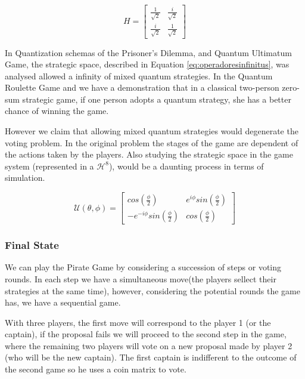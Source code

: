 \begin{equation}
H = \left[\begin{array}{cc}
\frac{1}{\sqrt{2}} & \frac{i}{\sqrt{2}}\\
\frac{i}{\sqrt{2}} & \frac{1}{\sqrt{2}}
\end{array}\right]
\label{eq:operators_piratas_quanticos_esoterico}
\end{equation}

In Quantization schemas of the Prisoner's Dilemma\cite{Letters2002}\cite{Eisert2008}, and Quantum Ultimatum Game\cite{Fra2011}, the strategic space, described in Equation \ref{eq:operadoresinfinitus}, was analysed allowed a infinity of mixed quantum strategies. In the Quantum Roulette Game\cite{Salimi2009} and \cite{Meyer1999} we have a demonstration that in a classical two-person zero-sum strategic game, if one person adopts a quantum strategy, she has a better chance of winning the game. 

However we claim that allowing mixed quantum strategies would degenerate the voting problem. In the original problem the stages of the game are dependent of the actions taken by the players. Also studying the strategic space in the game system (represented in a $\mathcal{H}^{8}$), would be a daunting process in terms of simulation. 

\begin{equation}
\mathcal{U}(\theta,\phi) = \left[\begin{array}{cc}
cos(\frac{\phi}{2}) & e^{i\phi}sin(\frac{\phi}{2})\\
-e^{-i\phi}sin(\frac{\phi}{2}) & cos(\frac{\phi}{2})
\end{array}\right]
\label{eq:operadoresinfinitus}
\end{equation}

\subsubsection{Final State}
\label{subsec:pirates_finalstate}

We can play the Pirate Game by considering a succession of steps or voting rounds. In each step we have a simultaneous move(the players sellect their strategies at the same time), however, considering the potential rounds the game has, we have a sequential game. 

With three players, the first move will correspond to the player 1 (or the captain), if the proposal fails we will proceed to the second step in the game, where the remaining two players will vote on a new proposal made by player 2 (who will be the new captain). The first captain is indifferent to the outcome of the second game so he uses a coin matrix to vote.


